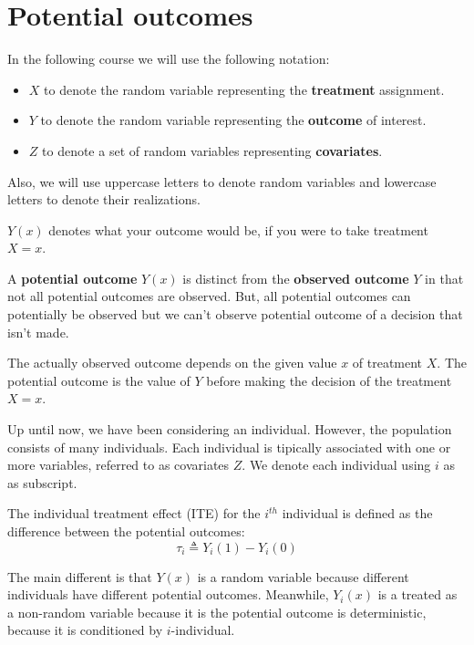 \chapter{Potential outcomes}
In the following course we will use the following notation:
\begin{itemize}
    \item $X$ to denote the random variable representing the \textbf{treatment}
          assignment.
    \item $Y$ to denote the random variable representing the \textbf{outcome} of
          interest.
    \item $Z$ to denote a set of random variables representing \textbf{covariates}.
\end{itemize}

Also, we will use uppercase letters to denote random variables and lowercase
letters to denote their realizations.

\begin{definition}
    $Y(x)$ denotes what your outcome would be, if you were to take treatment $X = x$.
\end{definition}
A \textbf{potential outcome} $Y(x)$ is distinct from the \textbf{observed outcome} $Y$ in that not
all potential outcomes are observed. But, all potential outcomes can potentially
be observed but we can't observe potential outcome of a decision that isn't made.

The actually observed outcome depends on the given value $x$ of treatment $X$.
The potential outcome is the value of $Y$ before making the decision of the 
treatment $X=x$.  

Up until now, we have been considering an individual. However, the population
consists of many individuals. Each individual is tipically associated with one or
more variables, referred to as covariates $Z$. We denote each individual using $i$
as as subscript.

\begin{definition}
    The individual treatment effect (ITE) for the $i^{th}$ individual
    is defined as the difference between the potential outcomes:
    \begin{equation}
        \tau_i \triangleq Y_i(1) - Y_i(0)
    \end{equation}

    The main different is that $Y(x)$ is a random variable because different individuals
    have different potential outcomes. Meanwhile, $Y_i(x)$ is a treated as a
    non-random variable because it is the potential outcome is deterministic, because 
    it is conditioned by $i$-individual.
\end{definition}

